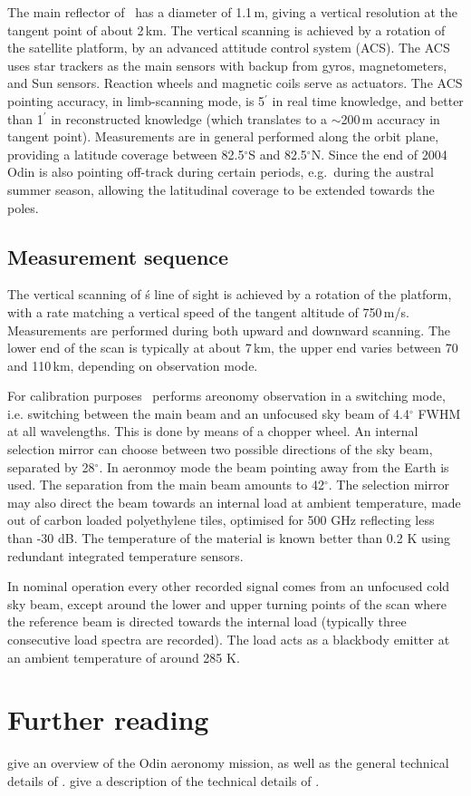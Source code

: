 The main reflector of \smr\ has a diameter of 1.1\,m, giving a
vertical resolution at the tangent point of about 2\,km. 
The vertical scanning is achieved by a rotation of the satellite
platform, by an advanced attitude control system (ACS). 
The ACS uses star trackers as the main sensors with backup from gyros, 
magnetometers, and Sun sensors. Reaction wheels and magnetic coils serve as 
actuators. The ACS pointing accuracy, in limb-scanning mode, is 5\(^{'}\) in
real time knowledge, and better than 1\(^{'}\) in reconstructed knowledge
(which translates to a \(\sim\)200\,m accuracy in tangent point).
Measurements are in general performed along the orbit plane, providing a
latitude coverage between 82.5$^{\circ}$S and 82.5$^{\circ}$N. Since the end of
2004 Odin is also pointing off-track during certain periods, e.g.\ during the
austral summer season, allowing the latitudinal coverage to be extended towards
the poles. 




\subsection{Measurement sequence}


The vertical scanning of \smr\'s line of sight is achieved by a
rotation of the platform, with a rate matching a vertical speed of
the tangent altitude of 750\,m/s. Measurements are performed during
both upward and downward scanning. The lower end of the scan is typically
at about 7\,km, the upper end varies between 70 and 110\,km, depending on
observation mode.

For calibration purposes \smr\ performs areonomy observation
in a switching mode, i.e. switching between the main beam and
an unfocused sky beam of 4.4$^{\circ}$ FWHM at all wavelengths. This is done
by means of a chopper wheel. An internal selection mirror
can choose between two possible directions of the sky beam,
separated by 28$^{\circ}$. In aeronmoy mode the beam pointing
away from the Earth is used. The separation from the main beam
amounts to 42$^{\circ}$.
The selection mirror may also direct the beam towards an internal
load at ambient temperature, made out of carbon loaded polyethylene 
tiles, optimised for 500 GHz reflecting less than -30 dB. 
The temperature of the material is known better than 0.2 K using 
redundant integrated temperature sensors.

In nominal operation every other recorded signal comes from an
unfocused cold sky beam, except around the lower and upper turning
points of the scan where the reference beam is directed towards
the internal load (typically three consecutive load spectra are recorded).
The load acts as a blackbody emitter at
an ambient temperature of around 285 K.


\section{Further reading}
\label{sec:reading}

\citet{murtagh:anove:02} give an overview of the Odin aeronomy mission, as well
as the general technical details of \smr. \citet{frisk:theod:03} give a description
of the technical details of \smr.


